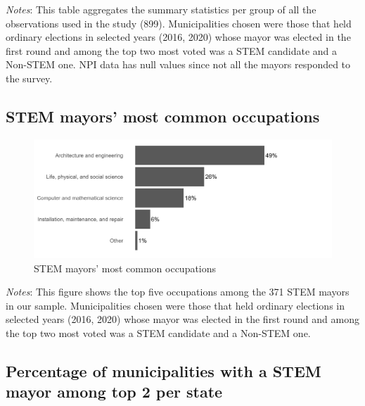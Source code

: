 \documentclass[
  letterpaper,
  DIV=11,
  numbers=noendperiod]{scrartcl}
\begin{document}
\emph{Notes}: This table aggregates the summary statistics per group of
all the observations used in the study (899). Municipalities chosen were
those that held ordinary elections in selected years (2016, 2020) whose
mayor was elected in the first round and among the top two most voted
was a STEM candidate and a Non-STEM one. NPI data has null values since
not all the mayors responded to the survey.

\subsection{STEM mayors' most common
occupations}\label{stem-mayors-most-common-occupations}

\begin{figure}[H]

\caption{STEM mayors' most common occupations}

{\centering \includegraphics{outputs/figures/barplot_stem_cbos_stem_ocupacao.png}

}

\end{figure}%

\emph{Notes}: This figure shows the top five occupations among the 371
STEM mayors in our sample. Municipalities chosen were those that held
ordinary elections in selected years (2016, 2020) whose mayor was
elected in the first round and among the top two most voted was a STEM
candidate and a Non-STEM one.

\subsection{Percentage of municipalities with a STEM mayor among top 2
per
state}\label{percentage-of-municipalities-with-a-stem-mayor-among-top-2-per-state}
\end{document}
